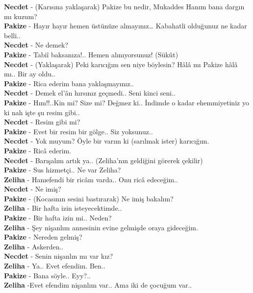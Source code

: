\documentclass[]{book}
\begin{document}
\textbf{Necdet} - (Karısına yaklaşarak) Pakize bu nedir, Mukaddes Hanım bana dargın mı kuzum?\\
\textbf{Pakize} - Hayır hayır hemen üstünüze almayınız\ldots{} Kabahatli olduğunuz ne kadar belli..\\
\textbf{Necdet} - Ne demek?\\
\textbf{Pakize} - Tabiî baksanıza!.. Hemen alınıyorsunuz! (Sükût)\\
\textbf{Necdet} - (Yaklaşarak) Peki karıcığım sen niye böylesin? Hâlâ mı Pakize hâlâ mı.. Bir ay oldu..\\
\textbf{Pakize} - Rica ederim bana yaklaşmayınız..\\
\textbf{Necdet} - Demek el'ân hırsınız geçmedi.. Seni kinci seni..\\
\textbf{Pakize} - Hım!!..Kin mi? Size mi? Değmez ki.. İndimde o kadar ehemmiyetiniz yo ki nah işte şu resim gibi..\\
\textbf{Necdet} - Resim gibi mi?\\
\textbf{Pakize} - Evet bir resim bir gölge.. Siz yoksunuz..\\
\textbf{Necdet} - Yok muyum? Öyle bir varım ki (sarılmak ister) karıcığım.\\
\textbf{Pakize} - Ricâ ederim.\\
\textbf{Necdet} - Barışalım artık ya.. (Zeliha'nın geldiğini görerek çekilir)\\
\textbf{Pakize} - Sus hizmetçi.. Ne var Zeliha?\\
\textbf{Zeliha} - Hanıefendi bir ricâm varda.. Onu ricâ edeceğim..\\
\textbf{Necdet} - Ne imiş?\\
\textbf{Pakize} - (Kocasının sesini bastırarak) Ne imiş bakalım?\\
\textbf{Zeliha} - Bir hafta izin isteyecektimde..\\
\textbf{Pakize} - Bir hafta izin mi.. Neden?\\
\textbf{Zeliha} - Şey nişanlım annesinin evine gelmişde oraya gideceğim.\\
\textbf{Pakize} - Nereden gelmiş?\\
\textbf{Zeliha} - Askerden..\\
\textbf{Necdet} - Senin nişanlın mı var kız?\\
\textbf{Zeliha} - Ya.. Evet efendim. Ben..\\
\textbf{Pakize} - Bana söyle.. Eyy?..\\
\textbf{Zeliha} -Evet efendim nişanlım var.. Ama iki de çocuğum var..\\
\end{document}
